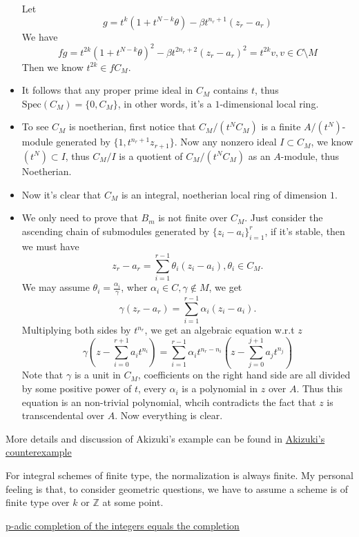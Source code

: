 \documentclass[../main.tex]{subfiles}
\begin{document}
\begin{example}
\begin{itemize}
Let $$g=t^{k}(1+t^{N-k}\theta)-\beta t^{n_{r}+1}(z_{r}-a_{r})$$
We have 
$$fg=t^{2k}(1+t^{N-k}\theta)^{2}-\beta t^{2n_{r}+2}(z_{r}-a_{r})^{2}=t^{2k}v, v\in C\setminus M$$
Then we know $t^{2k}\in fC_{M}$.
\item It follows that any proper prime ideal in $C_{M}$ contains $t$, thus $\mathrm{Spec}(C_{M})=\{0, C_{M}\}$, in other words, it's a $1$-dimensional local ring.
\item To see $C_{M}$ is noetherian, first notice that $C_{M}/(t^{N}C_{M})$ is a finite $A/(t^{N})$-module generated by $\{1,t^{n_{r}+1}z_{r+1}\}$. Now any nonzero ideal $I\subset C_{M}$, we know $(t^{N})\subset I$, thus $C_{M}/I$ is a quotient of $C_{M}/(t^{N}C_{M})$ as an $A$-module, thus Noetherian. 
\item Now it's clear that $C_{M}$ is an integral, noetherian local ring of dimension $1$.
\item We only need to prove that $B_{m}$ is not finite over $C_{M}$. Just consider the ascending chain of submodules generated by $\{z_{i}-a_{i}\}_{i=1}^{r}$, if it's stable, then we must have 
$$z_{r}-a_{r}=\sum_{i=1}^{r-1} \theta_{i}(z_{i}-a_{i}), \theta_{i}\in C_{M}.$$
We may assume $\theta_{i}=\frac{\alpha_{i}}{\gamma}$, wher $\alpha_{i}\in C, \gamma\notin M$, we get 
$$\gamma(z_{r}-a_{r})=\sum_{i=1}^{r-1} \alpha_{i}(z_{i}-a_{i}).$$
Multiplying both sides by $t^{n_{r}}$, we get an algebraic equation w.r.t $z$
$$\gamma(z-\sum_{i=0}^{r+1}a_{i}t^{n_{i}})=\sum_{i=1}^{r-1} \alpha_{i}t^{n_{r}-n_{i}}(z-\sum_{j=0}^{j+1}a_{j}t^{n_{j}})$$
Note that $\gamma$ is a unit in $C_{M}$, coefficients on the right hand side are all divided by some positive power of $t$, every $\alpha_{i}$ is a polynomial in $z$ over $A$. Thus this equation is an non-trivial polynomial, whcih contradicts the fact that $z$ is transcendental over $A$. Now everything is clear.
\end{itemize}

More details and discussion of Akizuki's example can be found in \href{https://arxiv.org/pdf/alg-geom/9503017.pdf}{Akizuki's counterexample}
\end{example}
\begin{remark}
For integral schemes of finite type, the normalization is always finite. My personal feeling is that, to consider geometric questions, we have to assume a scheme is of finite type over $k$ or $\mathbb{Z}$ at some point.
\end{remark}
\begin{remark}
\href{https://math.stackexchange.com/questions/879962/does-it-hold-that-the-p-adic-completion-of-the-integers-equals-the-completion}{p-adic completion of the integers equals the completion}
\end{remark}
\end{document}

